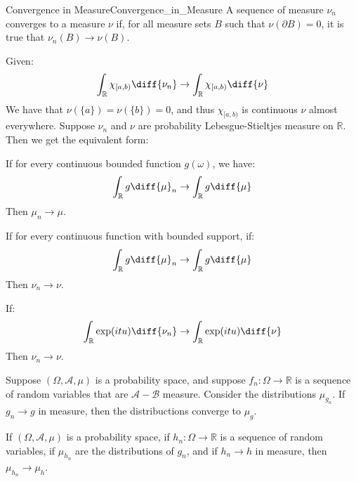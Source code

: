     \begin{ldefinition}{Convergence in Measure}{Convergence_in_Measure}
        A sequence of measure $\nu_{n}$ converges to a measure $\nu$ if,
        for all measure sets $B$ such that $\nu(\partial{B})=0$, it is
        true that $\nu_{n}(B)\rightarrow\nu(B)$.
    \end{ldefinition}
    Given:
    \begin{equation}
        \int_{\mathbb{R}}\chi_{[a,b)}\diff{\nu_{n}}
        \rightarrow\int_{\mathbb{R}}\chi_{[a,b)}\diff{\nu}
    \end{equation}
    We have that $\nu(\{a\})=\nu(\{b\})=0$, and thus $\chi_{[a,b)}$ is
    continuous $\nu$ almost everywhere. Suppose $\nu_{n}$ and $\nu$ are
    probability Lebesgue-Stieltjes measure on $\mathbb{R}$. Then we
    get the equivalent form:
    \begin{theorem}
        If for every continuous bounded function $g(\omega)$, we have:
        \begin{equation}
            \int_{\mathbb{R}}g\diff{\mu}_{n}\rightarrow
            \int_{\mathbb{R}}g\diff{\mu}
        \end{equation}
        Then $\mu_{n}\rightarrow\mu$.
    \end{theorem}
    \begin{theorem}
        If for every continuous function with bounded support,
        if:
        \begin{equation}
            \int_{\mathbb{R}}g\diff{\mu}_{n}\rightarrow
            \int_{\mathbb{R}}g\diff{\mu}
        \end{equation}
        Then $\nu_{n}\rightarrow\nu$.
    \end{theorem}
    \begin{theorem}
        If:
        \begin{equation}
            \int_{\mathbb{R}}\exp(itu)\diff{\nu_{n}}\rightarrow
            \int_{\mathbb{R}}\exp(itu)\diff{\nu}
        \end{equation}
        Then $\nu_{n}\rightarrow\nu$.
    \end{theorem}
    Suppose $(\Omega,\mathcal{A},\mu)$ is a probability space,
    and suppose $f_{n}:\Omega\rightarrow\mathbb{R}$ is a
    sequence of random variables that are
    $\mathcal{A}-\mathcal{B}$ measure. Consider the
    distributions $\mu_{g_{n}}$. If $g_{n}\rightarrow{g}$ in
    measure, then the distribuctions converge to $\mu_{g}$.
    \begin{theorem}
        If $(\Omega,\mathcal{A},\mu)$ is a probability space,
        if $h_{n}:\Omega\rightarrow\mathbb{R}$ is a
        sequence of random variables, if $\mu_{h_{n}}$ are the
        distributions of $g_{n}$, and if $h_{n}\rightarrow{h}$
        in measure, then $\mu_{h_{n}}\rightarrow\mu_{h}$.
    \end{theorem}
